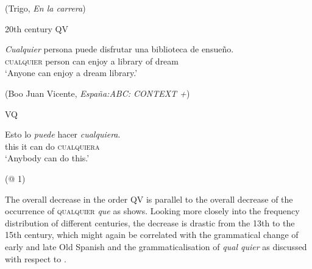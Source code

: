       (Trigo, \textit{En la carrera})
\z
\z

\ea \label{ex:key:290}
  20th century
\ea \label{ex:key:290-1} 
QV 

\gll \textit{Cualquier} {persona} {puede} disfrutar una biblioteca de ensueño.\\
\textsc{cualquier} person can enjoy a library of dream\\
\glt ‘Anyone can enjoy a dream library.’

(Boo Juan Vicente, \textit{España:ABC: CONTEXT +})
      
\ex \label{ex:key:290-2} 
VQ 

\gll Esto lo \textit{puede} hacer \textit{cualquiera}.\\
this it can do \textsc{cualquiera}\\
\glt ‘Anybody can do this.’

(@ 1)
\z
\z

The overall decrease in the order QV is parallel to the overall decrease of the occurrence of \textsc{qualquier} \textit{que} as  shows. Looking more closely into the frequency distribution of different centuries, the decrease is drastic from the 13th to the 15th century, which might again be correlated with the grammatical change of early and late Old Spanish and the grammaticalisation of \textit{qual quier} as discussed with respect to .


\begin{table}
\caption{\label{tab:key:20} Distribution of \textsc{qualquier} \textit{que} in my data}
\end{table}

